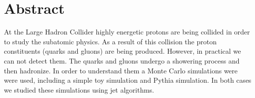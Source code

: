 
\chapter*{Abstract} 
At the Large Hadron Collider highly energetic protons are being collided in order to study the subatomic physics. As a result of this collision the proton constituents (quarks and gluons) are being produced.
However, in practical we can not detect them.
The quarks and gluons undergo a showering process and then hadronize.
In order to understand them a Monte Carlo simulations were were used, including a simple toy simulation and Pythia simulation. In both cases we studied these simulations using jet algorithms.

%
%
%
%




